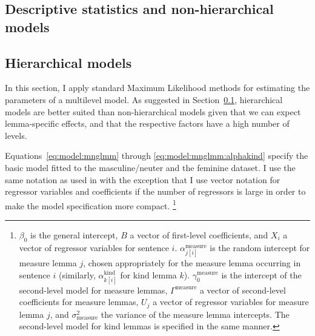 \documentclass[USenglish]{article}
\begin{document}

\subsection{Descriptive statistics and non-hierarchical models}
\label{sec:corpusnonhierarchicalmodel}






\subsection{Hierarchical models}
\label{sec:corpushierarchicalmodel}

In this section, I apply standard Maximum Likelihood methods for estimating the parameters of a multilevel model.
As suggested in Section~\ref{sec:corpusnonhierarchicalmodel}, hierarchical models are better suited than non-hierarchical models given that we can expect lemma-specific effects, and that the respective factors have a high number of levels.

Equations~\ref{eq:model:mnglmm} through \ref{eq:model:mnglmm:alphakind} specify the basic model fitted to the masculine\slash neuter and the feminine dataset.
I use the same notation as used in \cite{GelmanHill2006} with the exception that I use vector notation for regressor variables and coefficients if the number of regressors is large in order to make the model specification more compact.%
\footnote{
$\beta_0$ is the general intercept, $B$ a vector of first-level coefficients, and $X_i$ a vector of regressor variables for sentence $i$.
$\alpha^{\text{measure}}_{j[i]}$ is the random intercept for measure lemma $j$, chosen appropriately for the measure lemma occurring in sentence $i$ (similarly, $\alpha^{\text{kind}}_{k[i]}$ for kind lemma $k$).
$\gamma_0^{\text{measure}}$ is the intercept of the second-level model for measure lemmas, $\Gamma^{\text{measure}}$ a vector of second-level coefficients for measure lemmas, $U_j$ a vector of regressor variables for measure lemma $j$, and $\sigma_{\text{measure}}^2$ the variance of the measure lemma intercepts.
The second-level model for kind lemmas is specified in the same manner.
}
\end{document}

